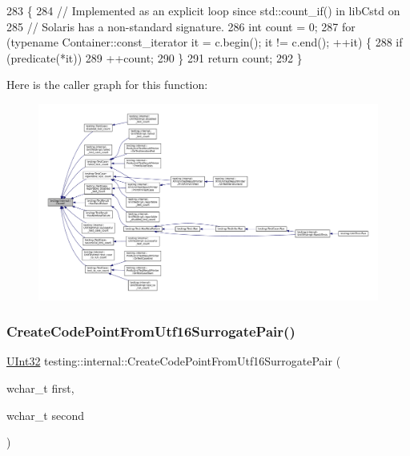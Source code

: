 \begin{DoxyCode}
283                                                             \{
284   \textcolor{comment}{// Implemented as an explicit loop since std::count\_if() in libCstd on}
285   \textcolor{comment}{// Solaris has a non-standard signature.}
286   \textcolor{keywordtype}{int} count = 0;
287   \textcolor{keywordflow}{for} (\textcolor{keyword}{typename} Container::const\_iterator it = c.begin(); it != c.end(); ++it) \{
288     \textcolor{keywordflow}{if} (predicate(*it))
289       ++count;
290   \}
291   \textcolor{keywordflow}{return} count;
292 \}
\end{DoxyCode}
Here is the caller graph for this function\+:
\nopagebreak
\begin{figure}[H]
\begin{center}
\leavevmode
\includegraphics[width=350pt]{namespacetesting_1_1internal_a1e77a774d910346eff11a86d8df783a5_icgraph}
\end{center}
\end{figure}
\mbox{\label{namespacetesting_1_1internal_ac8ef1bb10cd9e69de939789b759e6bc9}} 
\subsubsection{\texorpdfstring{Create\+Code\+Point\+From\+Utf16\+Surrogate\+Pair()}{CreateCodePointFromUtf16SurrogatePair()}}
{\footnotesize\ttfamily \hyperlink{namespacetesting_1_1internal_a40d4fffcd2bf56f18b1c380615aa85e3}{U\+Int32} testing\+::internal\+::\+Create\+Code\+Point\+From\+Utf16\+Surrogate\+Pair (\begin{DoxyParamCaption}\item[{wchar\+\_\+t}]{first,  }\item[{wchar\+\_\+t}]{second }\end{DoxyParamCaption})\hspace{0.3cm}{\ttfamily [inline]}}



